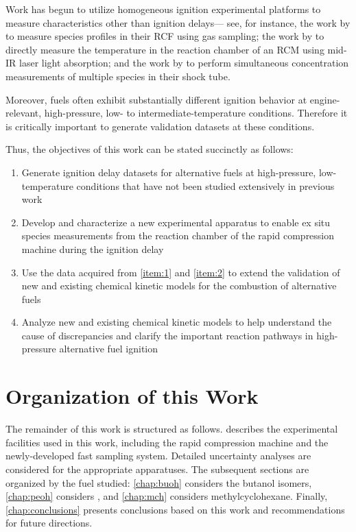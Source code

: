 \documentclass[../main.tex]{subfiles}
\begin{document}
Work has begun to utilize homogeneous ignition experimental
platforms to measure characteristics other than ignition delays---%
see, for instance, the work by \textcite{Karwat2011a} to measure species
profiles in their RCF using gas sampling; the work by \textcite{Das2012,Uddi2012}
to directly measure the temperature in the reaction chamber of an RCM using
mid-IR laser light absorption; and the work by \textcite{Stranic2013}
to perform simultaneous concentration measurements of multiple species in their
shock tube.

Moreover, fuels often exhibit substantially different ignition behavior
at engine-relevant, high-pressure, low- to intermediate-temperature
conditions. Therefore it is critically important to generate validation
datasets at these conditions.

Thus, the objectives of this work can be stated succinctly as follows:

\begin{enumerate}
\item \label{item:1} Generate ignition delay datasets for alternative
fuels at high-pressure, low-temperature conditions that have not been
studied extensively in previous work

\item \label{item:2} Develop and characterize a new experimental
apparatus to enable ex situ species measurements from the reaction
chamber of the rapid compression machine during the ignition delay

\item Use the data acquired from \autoref{item:1} and \autoref{item:2}
to extend the validation of new and existing chemical kinetic models
for the combustion of alternative fuels

\item Analyze new and existing chemical kinetic models to help
understand the cause of discrepancies and clarify the important
reaction pathways in high-pressure alternative fuel ignition
\end{enumerate}

\section{Organization of this Work}

The remainder of this work is structured as follows.
 describes the experimental facilities
used in this work, including the rapid compression machine and the newly-developed
fast sampling system. Detailed uncertainty analyses are considered for the
appropriate apparatuses. The subsequent sections are organized by the fuel
studied: \autoref{chap:buoh} considers the butanol isomers, \autoref{chap:peoh}
considers \iPeOH{}, and \autoref{chap:mch} considers methylcyclohexane.
Finally, \autoref{chap:conclusions} presents conclusions based on this work and
recommendations for future directions.
\end{document}

